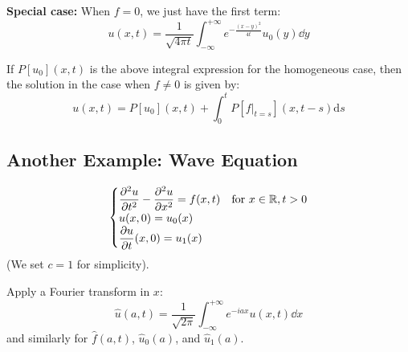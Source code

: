 \textbf{Special case:} When $f = 0$, we just have the first term:
$$ u(x,t) = \frac{1}{\sqrt{4\pi t}} \int_{-\infty}^{+\infty} e^{-\frac{(x-y)^2}{4t}} u_0(y) \dd y $$

\begin{center}
\end{center}

\begin{theorem}
If $P[u_0](x,t)$ is the above integral expression for the homogeneous case, then the solution in the case when $f \neq 0$ is given by:
\[
u(x,t) = P[u_0](x,t) + \int_0^t P[f|_{t=s}](x, t-s) \mathrm{d}s
\]
\end{theorem}

\subsection{Another Example: Wave Equation}

\begin{equation}
\begin{cases}
    \displaystyle \frac{\partial^2 u}{\partial t^2} - \frac{\partial^2 u}{\partial x^2} = f(x,t) & \text{for } x \in \mathbb{R}, t > 0 \\
    u(x,0) = u_0(x) \\
    \displaystyle \frac{\partial u}{\partial t}(x,0) = u_1(x)
\end{cases}
\end{equation}
(We set $c=1$ for simplicity).

Apply a Fourier transform in $x$:
$$ \hat{u}(a,t) = \frac{1}{\sqrt{2\pi}} \int_{-\infty}^{+\infty} e^{-iax} u(x,t) \dd x $$
and similarly for $\hat{f}(a,t)$, $\hat{u}_0(a)$, and $\hat{u}_1(a)$.

